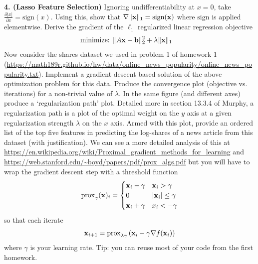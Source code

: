 \documentclass[12pt,letterpaper,fleqn]{hmcpset}
\begin{document}
\textbf{4. (Lasso Feature Selection)} Ignoring undifferentiability at $x=0$, take $\frac{\partial |x|}{\partial x}
= \mathrm{sign} (x)$. Using this, show that $\nabla \|{\bf x}\|_1 = \mathrm{sign}({\bf x})$ where $\mathrm{sign}$ is applied
elementwise. Derive the gradient of the $\ell_1$ regularized linear regression objective
\begin{align*}
    \text{minimize: } & \|A{\bf x} - {\bf b}\|_2^2 + \lambda \|{\bf x}\|_1
\end{align*}
Now consider the shares dataset we used in problem 1 of homework 1
(\url{https://math189r.github.io/hw/data/online_news_popularity/online_news_popularity.txt}).
Implement a gradient descent based solution of the above optimization problem for this data. Produce
the convergence plot (objective vs. iterations) for a non-trivial value of $\lambda$.
In the same figure (and different axes) produce a `regularization path' plot. Detailed
more in section 13.3.4 of Murphy, a regularization path is a plot of the optimal weight on
the $y$ axis at a given regularization strength $\lambda$ on the $x$ axis. Armed with this
plot, provide an ordered list of the top five features in predicting the log-shares of a news
article from this dataset (with justification). We can see a more detailed analysis of this
at \url{https://en.wikipedia.org/wiki/Proximal_gradient_methods_for_learning} and
\url{https://web.stanford.edu/~boyd/papers/pdf/prox_algs.pdf} but you will have to wrap
the gradient descent step with a threshold function
\[
    \mathrm{prox}_{\gamma}({\bf x})_i = \begin{cases}
        {\bf x}_i - \gamma & {\bf x}_i > \gamma\\
        0 & |{\bf x}_i| \leq \gamma\\
        {\bf x}_i + \gamma & x_i < -\gamma
    \end{cases}
\]
so that each iterate
\[
    {\bf x}_{i+1} = \mathrm{prox}_{\lambda\gamma}\left( {\bf x}_i - \gamma \nabla f({\bf x}_i) \right)
\]
where $\gamma$ is your learning rate. Tip: you can reuse most of your code from the
first homework.\\[1em]
\end{document}
